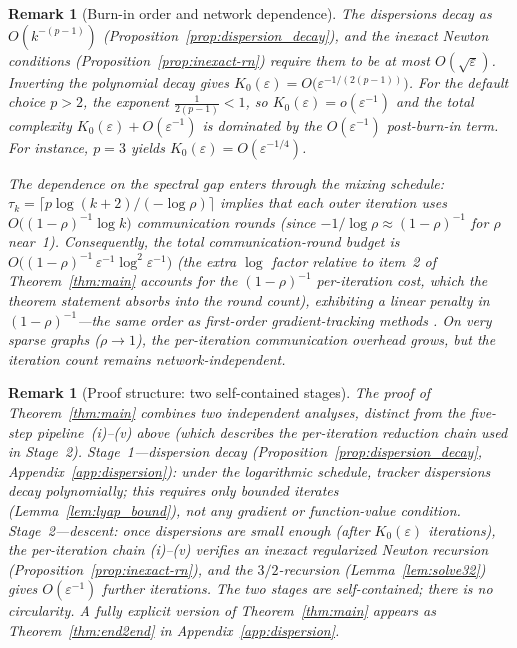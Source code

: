 \documentclass[10pt,twocolumn,letterpaper]{article}
\def\cO{O}%
\theoremstyle{compact}
\theoremstyle{compactremark}
\newtheorem{remark}[theorem]{Remark}
\newcommand{\cO}{\mathcal{O}}
\begin{document}
\begin{remark}[Burn-in order and network dependence]\label{rem:burnin_order}
The dispersions decay as $\cO(k^{-(p-1)})$
(Proposition~\ref{prop:dispersion_decay}), and the inexact Newton
conditions (Proposition~\ref{prop:inexact-rn}) require them to be at
most $\cO(\sqrt\varepsilon)$.
Inverting the polynomial decay gives
$K_0(\varepsilon)=\cO\!\bigl(\varepsilon^{-1/(2(p-1))}\bigr)$.
For the default choice $p>2$, the exponent $\frac{1}{2(p-1)}<1$, so
$K_0(\varepsilon)=o(\varepsilon^{-1})$ and the total complexity
$K_0(\varepsilon)+\cO(\varepsilon^{-1})$ is dominated by the
$\cO(\varepsilon^{-1})$ post-burn-in term.
For instance, $p=3$ yields
$K_0(\varepsilon)=\cO(\varepsilon^{-1/4})$.

The dependence on the spectral gap enters through the mixing schedule:
$\tau_k=\lceil p\log(k{+}2)/({-\log\rho})\rceil$ implies that each
outer iteration uses $\cO\!\bigl((1{-}\rho)^{-1}\log k\bigr)$
communication rounds (since $-1/\log\rho\approx(1{-}\rho)^{-1}$ for
$\rho$ near~1).
Consequently, the total communication-round budget is
$\cO\!\bigl((1{-}\rho)^{-1}\,\varepsilon^{-1}\log^2\varepsilon^{-1}\bigr)$
(the extra $\log$ factor relative to item~2 of Theorem~\ref{thm:main}
accounts for the $(1{-}\rho)^{-1}$ per-iteration cost, which the
theorem statement absorbs into the round count),
exhibiting a \emph{linear} penalty in $(1{-}\rho)^{-1}$---the same
order as first-order gradient-tracking methods
\citep{nedic2017diging}.
On very sparse graphs ($\rho\to 1$), the per-iteration communication
overhead grows, but the iteration count remains network-independent.
\end{remark}

\begin{remark}[Proof structure: two self-contained stages]
The proof of Theorem~\ref{thm:main} combines two independent
analyses, distinct from the five-step pipeline~(i)--(v) above
(which describes the \emph{per-iteration} reduction chain used
in Stage~2).
\emph{Stage~1---dispersion decay}
(Proposition~\ref{prop:dispersion_decay},
Appendix~\ref{app:dispersion}): under the logarithmic schedule,
tracker dispersions decay polynomially; this requires only
bounded iterates (Lemma~\ref{lem:lyap_bound}), not any gradient
or function-value condition.
\emph{Stage~2---descent}: once dispersions are small enough
(after $K_0(\varepsilon)$ iterations), the per-iteration chain
(i)--(v) verifies an inexact regularized Newton recursion
(Proposition~\ref{prop:inexact-rn}), and the $3/2$-recursion
(Lemma~\ref{lem:solve32}) gives $\cO(\varepsilon^{-1})$ further
iterations.
The two stages are self-contained; there is no circularity.
A fully explicit version of Theorem~\ref{thm:main} appears as
Theorem~\ref{thm:end2end} in Appendix~\ref{app:dispersion}.
\end{remark}
\end{document}
